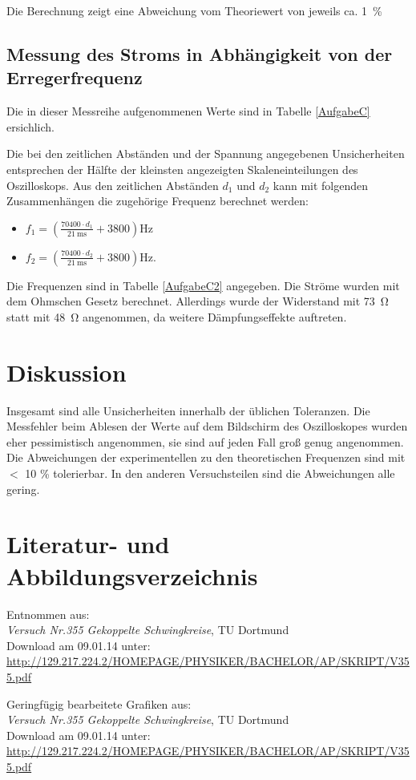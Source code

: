 \documentclass[11pt,ngerman,a4paper]{article}
\begin{document}
Die Berechnung zeigt eine Abweichung vom Theoriewert von jeweils ca. \SI{1}{\percent}
\subsection{Messung des Stroms in Abhängigkeit von der Erregerfrequenz}
Die in dieser Messreihe aufgenommenen Werte sind in Tabelle \ref{AufgabeC} ersichlich.

Die bei den zeitlichen Abständen und der Spannung angegebenen Unsicherheiten entsprechen der Hälfte der kleinsten angezeigten Skaleneinteilungen des Oszilloskops. Aus den zeitlichen Abständen $d_1$ und $d_2$ kann mit folgenden Zusammenhängen die zugehörige Frequenz berechnet werden:
\begin{itemize}
\item $f_1 = \left( \frac{70400\cdot d_1}{\SI{21}{\milli\second}}+3800 \right)\si{\Hz}$
\item $f_2 = \left( \frac{70400\cdot d_2}{\SI{21}{\milli\second}}+3800\right)\si{\Hz}$.
\end{itemize}
Die Frequenzen sind in Tabelle \ref{AufgabeC2} angegeben. Die Ströme wurden mit dem Ohmschen Gesetz berechnet. Allerdings wurde der Widerstand mit \SI{73}{\ohm}  statt mit \SI{48}{\ohm} angenommen, da weitere Dämpfungseffekte auftreten.

\section{Diskussion}
Insgesamt sind alle Unsicherheiten innerhalb der üblichen Toleranzen. Die Messfehler beim Ablesen der Werte auf dem Bildschirm des Oszilloskopes wurden eher pessimistisch angenommen, sie sind auf jeden Fall groß genug angenommen. Die Abweichungen der experimentellen zu den theoretischen Frequenzen sind mit $<$ 10 \% tolerierbar.\newline
In den anderen Versuchsteilen sind die Abweichungen alle gering.

\section{Literatur- und Abbildungsverzeichnis}
\begin{enumerate}[{[}1{]}]
\item Entnommen aus: \\\textit{Versuch Nr.355 Gekoppelte Schwingkreise}, TU Dortmund\\
Download am 09.01.14 unter:\\
\url{http://129.217.224.2/HOMEPAGE/PHYSIKER/BACHELOR/AP/SKRIPT/V355.pdf}
\item Geringfügig bearbeitete Grafiken aus:\\ \textit{Versuch Nr.355 Gekoppelte Schwingkreise}, TU Dortmund\\
Download am 09.01.14 unter:\\
\url{http://129.217.224.2/HOMEPAGE/PHYSIKER/BACHELOR/AP/SKRIPT/V355.pdf}
\end{enumerate}
\end{document}
